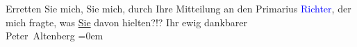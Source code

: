            \pstart
           Erretten Sie mich,  Sie mich, durch Ihre
                    Mitteilung an den Primarius \textcolor{blue}{Richter}{}\ledrightnote{\textcolor{blue}{Karl Richter}}, der
                    mich fragte, was \uline{Sie} davon hielten?!?\pend
           \pstart
           Ihr ewig dankbarer{\\[\baselineskip]}\spacefill\mbox{Peter Altenberg}\pend
           \leftskip=0em{}\endnumbering{}  
      